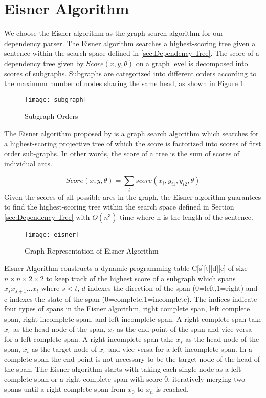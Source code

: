 \section{Eisner Algorithm}
\label{sec:Eisner Algorithm}
We choose the Eisner algorithm as the graph search algorithm for our dependency parser. The Eisner algorithm searches a highest-scoring tree given a sentence within the search space defined in \ref{sec:Dependency Tree}. The score of a dependency tree given by $Score(x,y,\theta)$ on a graph level is decomposed into scores of subgraphs. Subgraphs are categorized into different orders according to the maximum number of nodes sharing the same head, as shown in Figure \ref{fig:subgraph}. 
\begin{figure}
  \centering
    \texttt{[image: subgraph]}
  \caption{Subgraph Orders}
  \label{fig:subgraph}
\end{figure}

The Eisner algorithm proposed by \cite{eisner1996three} is a graph search algorithm which searches for a highest-scoring projective tree of which the score is factorized into scores of first order sub-graphs.  In other words, the score of a tree is the sum of scores of individual arcs. 

\begin{equation}
Score(x,y,\theta)=\sum_i score(x_i,y_{i1},y_{i2},\theta)
\end{equation}
Given the scores of all possible arcs in the graph, the Eisner algorithm guarantees to find the highest-scoring tree within the search space defined in Section \ref{sec:Dependency Tree} with $O(n^3)$ time where n is the length of the sentence.
\begin{figure}
  \centering
    \texttt{[image: eisner]}
  \caption{Graph Representation of Eisner Algorithm}
  \label{fig:eisner}
\end{figure}
Eisner Algorithm constructs a dynamic programming table C[s][t][d][c] of size $n\times n\times 2\times 2$ to keep track of  the highest score of a subgraph which spans
$x_s x_{s+1}...x_t$ where $s<t$, $d$ indexes the direction of the span (0=left,1=right) and c indexes the state of the span (0=complete,1=incomplete). The indices
indicate four types of spans in the Eisner algorithm, right complete span, left complete span, right incomplete span, and left incomplete span. A right complete span
take $x_s$ as the head node of the span, $x_t$ as the end point of the span and vice versa for a left complete span. A right incomplete span take $x_s$ as the head
node of the span, $x_t$ as the target node of $x_s$ and vice versa for a left incomplete span. In a complete span the end point is not necessary to be the target
node of the head of the span. The Eisner algorithm starts with taking each single node as a left complete span or a right complete 
span with score 0, iteratively merging two spans until a right complete span from $x_0$ to $x_n$ is reached. 


